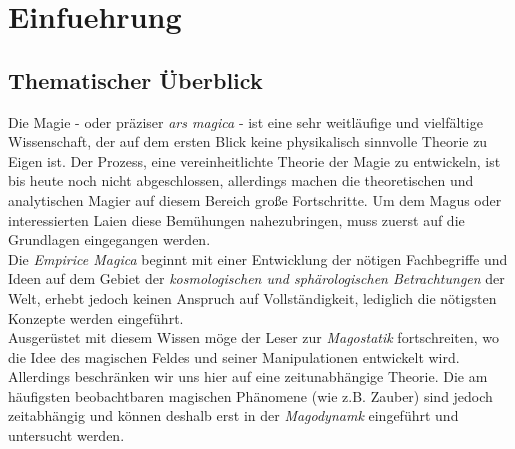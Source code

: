 \chapter[tocentry=Einführung, head=Einführung]{Einfuehrung}
\section{Thematischer Überblick}
Die Magie - oder präziser \emph{ars magica} - ist eine sehr weitläufige und vielfältige Wissenschaft, der auf dem ersten Blick keine physikalisch sinnvolle Theorie zu Eigen ist. Der Prozess, eine vereinheitlichte Theorie der Magie zu entwickeln, ist bis heute noch nicht abgeschlossen, allerdings machen die theoretischen und analytischen Magier auf diesem Bereich große Fortschritte. Um dem Magus oder interessierten Laien diese Bemühungen nahezubringen, muss zuerst auf die Grundlagen eingegangen werden. \\
Die \emph{Empirice Magica} beginnt mit einer Entwicklung der nötigen Fachbegriffe und Ideen auf dem Gebiet der \emph{kosmologischen und sphärologischen Betrachtungen} der Welt, erhebt jedoch keinen Anspruch auf Vollständigkeit, lediglich die nötigsten Konzepte werden eingeführt.\\
Ausgerüstet mit diesem Wissen möge der Leser zur \emph{Magostatik}  fortschreiten, wo die Idee des magischen Feldes und seiner Manipulationen entwickelt wird. Allerdings beschränken wir uns hier auf eine zeitunabhängige Theorie.
Die am häufigsten beobachtbaren magischen Phänomene (wie z.B. Zauber) sind jedoch zeitabhängig und können deshalb erst in der \emph{Magodynamk} eingeführt und untersucht werden.
